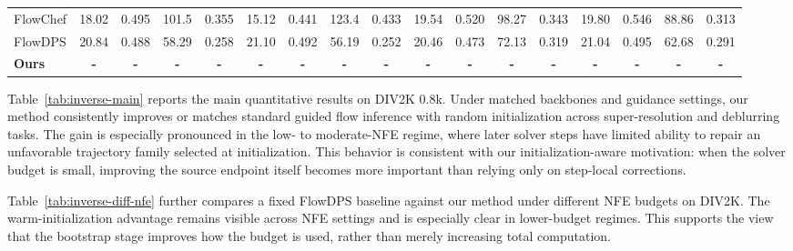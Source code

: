 \documentclass[letterpaper]{article} %
\begin{document}
\begin{table}[t]
{\begin{tabular}{lcccccccccccccccc}
FlowChef
& 18.02 & 0.495 & 101.5 & 0.355
& 15.12 & 0.441 & 123.4 & 0.433
& 19.54 & 0.520 & 98.27 & 0.343
& 19.80 & 0.546 & 88.86 & 0.313 \\

FlowDPS
& 20.84 & 0.488 & 58.29 & 0.258
& 21.10 & 0.492 & 56.19 & 0.252
& 20.46 & 0.473 & 72.13 & 0.319
& 21.04 & 0.495 & 62.68 & 0.291 \\

\textbf{Ours}
& \textbf{-} & \textbf{-} & \textbf{-} & \textbf{-}
& \textbf{-} & \textbf{-} & \textbf{-} & \textbf{-}
& \textbf{-} & \textbf{-} & \textbf{-} & \textbf{-}
& \textbf{-} & \textbf{-} & \textbf{-} & \textbf{-} \\
\hline
\end{tabular}
}
\end{table}

Table~\ref{tab:inverse-main} reports the main quantitative results on DIV2K 0.8k.
Under matched backbones and guidance settings, our method consistently improves or matches
standard guided flow inference with random initialization across super-resolution and deblurring tasks.
The gain is especially pronounced in the low- to moderate-NFE regime, where later solver steps
have limited ability to repair an unfavorable trajectory family selected at initialization.
This behavior is consistent with our initialization-aware motivation:
when the solver budget is small, improving the source endpoint itself becomes more important
than relying only on step-local corrections.

Table~\ref{tab:inverse-diff-nfe} further compares a fixed FlowDPS baseline \citep{flowdps2024} against our method under different NFE budgets on DIV2K. The warm-initialization advantage remains visible across NFE settings and is especially clear in lower-budget regimes. This supports the view that the bootstrap stage improves how the budget is used, rather than merely increasing total computation.
\end{document}
